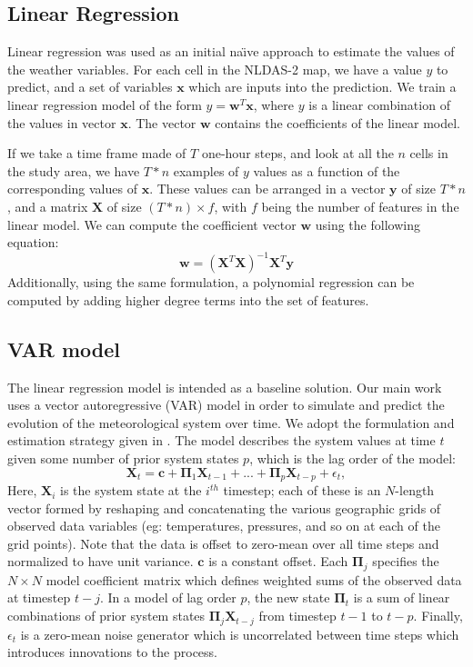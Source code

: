\documentclass{article} %
\newcommand{\bs}{\boldsymbol}
\newcommand{\VARlag}{p}
\newcommand{\VARdata}{\bs{X}}
\newcommand{\VARmodel}{\bs{\Pi}}
\newcommand{\VARoffset}{\bs{c}}
\newcommand {\VARnoise}{\epsilon}
\begin{document}
\subsection{Linear Regression}
Linear regression was used as an initial na\"{\i}ve approach to estimate the values of the weather variables. For each cell in the NLDAS-2 map, we have a value $y$ to predict, and a set of variables $\bs{x}$ which are inputs into the prediction. We train a linear regression model of the form $y = \bs{w}^T\bs{x}$, where $y$ is a linear combination of the values in vector $\bs{x}$. The vector $\bs{w}$ contains the coefficients of the linear model.

If we take a time frame made of $T$ one-hour steps, and look at all the $n$ cells in the study area, we have $T*n$ examples of $y$ values as a function of the corresponding values of $\bs{x}$. These values can be arranged in a vector $\bs{y}$ of size $T*n$, and a matrix $\bs{X}$ of size $(T*n) \times f$, with $f$ being the number of features in the linear model. We can compute the coefficient vector $\bs{w}$ using the following equation:
\begin{equation}
	\bs{w} = (\bs{X}^T \bs{X})^{-1}\bs{X}^T\bs{y}
\end{equation}
Additionally, using the same formulation, a polynomial regression can be computed by adding higher degree terms into the set of features.


\subsection{VAR model}
The linear regression model is intended as a baseline solution. Our main work uses a vector autoregressive (VAR) model in order to simulate and predict the evolution of the meteorological system over time.  We adopt the formulation and estimation strategy given in \cite{SpluTimeSeries2006}.  The model describes the system values at time $t$ given some number of prior system states $p$, which is the lag order of the model:\
\begin{equation}
\VARdata_t = \VARoffset + \VARmodel_1 \VARdata_{t-1} + ... +  \VARmodel_\VARlag \VARdata_{t-\VARlag} + \VARnoise_t,
\end{equation}
Here, $\VARdata_i$ is the system state at the $i^{th}$ timestep; each of these is an $N$-length vector formed by reshaping and concatenating the various geographic grids of observed data variables (eg: temperatures, pressures, and so on at each of the grid points). Note that the data is offset to zero-mean over all time steps and normalized to have unit variance. $\VARoffset$ is a constant offset. Each $\VARmodel_j$ specifies the $N \times N$ model coefficient matrix which defines weighted sums of the observed data at timestep $t - j$. In a model of lag order $\VARlag$, the new state $\VARmodel_t$ is a sum of linear combinations of prior system states $\VARmodel_j \VARdata_{t-j}$ from timestep $t-1$ to $t - \VARlag$. Finally, $\VARnoise_t$ is a zero-mean noise generator which is uncorrelated between time steps which introduces innovations to the process.
\end{document}

